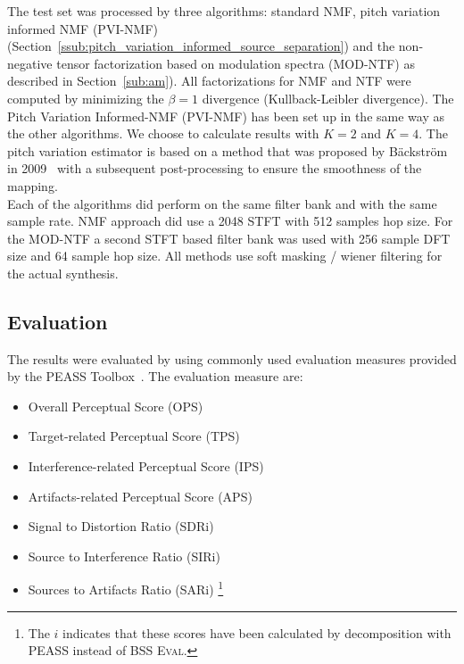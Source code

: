 The test set was processed by three algorithms: standard NMF, pitch variation informed NMF (PVI-NMF) (Section~\ref{ssub:pitch_variation_informed_source_separation}) and the non-negative tensor factorization based on modulation spectra (MOD-NTF) as described in Section~\ref{sub:am}). All factorizations for NMF and NTF were computed by minimizing the $\beta = 1$ divergence (Kullback-Leibler divergence). The Pitch Variation Informed-NMF (PVI-NMF) has been set up in the same way as the other algorithms. We choose to calculate results with $K=2$ and $K=4$. The pitch variation estimator is based on a method that was proposed by B\"ackstr\"om in 2009~\cite{backstrom09} with a subsequent post-processing to ensure the smoothness of the mapping. \\

Each of the algorithms did perform on the same filter bank and with the same sample rate. NMF approach did use a 2048 STFT with 512 samples hop size. For the MOD-NTF a second STFT based filter bank was used with 256 sample DFT size and 64 sample hop size. All methods use soft masking / wiener filtering for the actual synthesis.

\subsection{Evaluation}
\label{sub:results}

The results were evaluated by using commonly used evaluation measures provided by the {PEASS} Toolbox~\cite{emiya11}. The evaluation measure are:

\begin{itemize}
  \item Overall Perceptual Score (OPS)
  \item Target-related Perceptual Score (TPS)
  \item Interference-related Perceptual Score (IPS)
  \item Artifacts-related Perceptual Score (APS)
  \item Signal to Distortion Ratio (SDRi)
  \item Source to Interference Ratio (SIRi)
  \item Sources to Artifacts Ratio (SARi) \footnote{The $i$ indicates that these scores have been calculated by decomposition with PEASS \cite{emiya11} instead of \textsc{BSS Eval}.}
\end{itemize}

